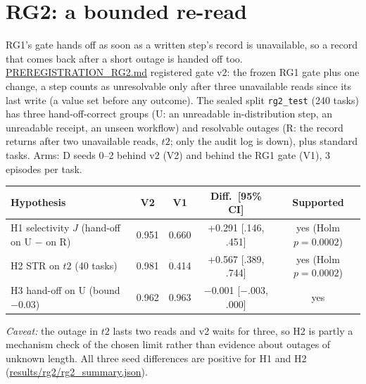 \documentclass[11pt]{article}
\newcommand{\code}[1]{\texttt{\small #1}}
\begin{document}
\section{RG2: a bounded re-read}
\label{app:rg2}
RG1's gate hands off as soon as a written step's record is unavailable, so a record that comes back after a short
outage is handed off too. \url{PREREGISTRATION_RG2.md} registered gate v2: the frozen RG1 gate plus one change, a step
counts as unresolvable only after three unavailable reads since its last write (a value set before any outcome). The
sealed split \code{rg2\_test} (240 tasks) has three hand-off-correct groups (U: an unreadable in-distribution step, an
unreadable receipt, an unseen workflow) and resolvable outages (R: the record returns after two unavailable reads, $t2$;
only the audit log is down), plus standard tasks. Arms: D seeds 0--2 behind v2 (V2) and behind the RG1 gate (V1), 3
episodes per task.
\begin{center}\footnotesize
\begin{tabular}{@{}lcccc@{}}
\toprule
Hypothesis & V2 & V1 & Diff.\ [95\% CI] & Supported \\
\midrule
H1 selectivity $J$ (hand-off on U $-$ on R) & 0.951 & 0.660 & +0.291 [.146, .451] & yes (Holm $p=0.0002$) \\
H2 STR on $t2$ (40 tasks) & 0.981 & 0.414 & +0.567 [.389, .744] & yes (Holm $p=0.0002$) \\
H3 hand-off on U (bound $-0.03$) & 0.962 & 0.963 & $-$0.001 [$-$.003, .000] & yes \\
\bottomrule
\end{tabular}
\end{center}
\emph{Caveat:} the outage in $t2$ lasts two reads and v2 waits for three, so H2 is partly a mechanism check of the
chosen limit rather than evidence about outages of unknown length. All three seed differences are positive for H1 and
H2 (\url{results/rg2/rg2_summary.json}).
\end{document}

